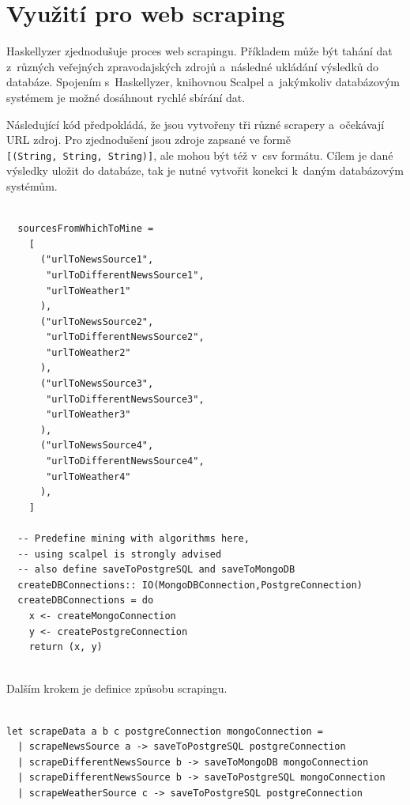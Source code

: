 \documentclass[male, czech]{kithesis}
\newenvironment{code}{\captionsetup{type=listing}}{}
\newcommand{\haskellInline}[1]{\colorbox{gray!10}{\texttt{#1}}}
\begin{document}
\section{Využití pro web scraping}

Haskellyzer zjednodušuje proces web scrapingu. 
Příkladem může být tahání dat z~různých veřejných zpravodajských zdrojů
a~následné ukládání výsledků do databáze. 
Spojením s~Haskellyzer, knihovnou Scalpel
a~jakýmkoliv databázovým systémem je možné dosáhnout rychlé sbírání dat.

Následující kód předpokládá, 
že jsou vytvořeny tři různé scrapery
a~očekávají URL zdroj.
Pro zjednodušení jsou zdroje zapsané ve formě \\ 
\haskellInline{[(String, String, String)]}, 
ale mohou být též v~csv formátu.
Cílem je dané výsledky uložit do databáze,
tak je nutné vytvořit konekci k~daným databázovým systémům. 

\newpage

\begin{code}
\begin{verbatim}

  sourcesFromWhichToMine = 
    [
      ("urlToNewsSource1", 
       "urlToDifferentNewsSource1",
       "urlToWeather1"
      ),
      ("urlToNewsSource2", 
       "urlToDifferentNewsSource2",
       "urlToWeather2"
      ),
      ("urlToNewsSource3", 
       "urlToDifferentNewsSource3",
       "urlToWeather3"
      ),
      ("urlToNewsSource4", 
       "urlToDifferentNewsSource4",
       "urlToWeather4"
      ),
    ]
  
  -- Predefine mining with algorithms here, 
  -- using scalpel is strongly advised
  -- also define saveToPostgreSQL and saveToMongoDB
  createDBConnections:: IO(MongoDBConnection,PostgreConnection)
  createDBConnections = do
    x <- createMongoConnection 
    y <- createPostgreConnection 
    return (x, y)
  
\end{verbatim}
\end{code}

Dalším krokem je definice způsobu scrapingu. 

\begin{code}
\begin{verbatim}

let scrapeData a b c postgreConnection mongoConnection = 
  | scrapeNewsSource a -> saveToPostgreSQL postgreConnection
  | scrapeDifferentNewsSource b -> saveToMongoDB mongoConnection
  | scrapeDifferentNewsSource b -> saveToPostgreSQL mongoConnection
  | scrapeWeatherSource c -> saveToPostgreSQL postgreConnection

\end{verbatim}
\end{code}
\end{document}
